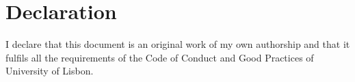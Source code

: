 \chapter*{Declaration}

I declare that this document is an original work of my own authorship and that 
it fulfils all the requirements of the Code of Conduct and Good Practices of University of Lisbon.
\clearpage
\thispagestyle{empty}
\cleardoublepage

